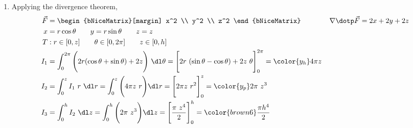 \begin{enumerate}
     \item Applying the divergence theorem,
           \begin{align}
                \vec{F} & = \begin{bNiceMatrix}[margin]
                                 x^2 \\ y^2 \\ z^2
                            \end{bNiceMatrix} \qquad\qquad
                \nabla \dotp \vec{F} = 2x + 2y + 2z                         \\
                x       & = r\cos \theta \qquad y = r\sin \theta
                \qquad z = z                                                \\
                T       & : r \in [0, z] \qquad \theta \in [0, 2\pi] \qquad
                z \in [0, h]                                                \\
                I_1     & = \int_{0}^{2\pi} \Bigg(2r(\cos \theta
                + \sin \theta) + 2z\Bigg)
                \ \dl \theta
                = \Bigg[ 2r\ (\sin \theta - \cos \theta) + 2z\ \theta \Bigg]_{0}^{2\pi}
                = {\color{y_h} 4\pi z}                                      \\
                I_2     & = \int_{0}^{z} I_1 \ r\ \dl r
                = \int_{0}^{z} \Bigg( 4\pi z\ r \Bigg) \dl r
                = \Bigg[ 2\pi z\ r^2 \Bigg]_{0}^{z}
                = {\color{y_p} 2\pi\ z^3 }                                  \\
                I_3     & = \int_{0}^{h} I_2\ \dl z = \int_{0}^{h}
                \Bigg( 2\pi\ z^3 \Bigg) \dl z
                = \Bigg[ \frac{\pi\ z^4}{2} \Bigg]_{0}^{h}
                = {\color{brown6} \frac{\pi h^4}{2}}
           \end{align}


\end{enumerate}
